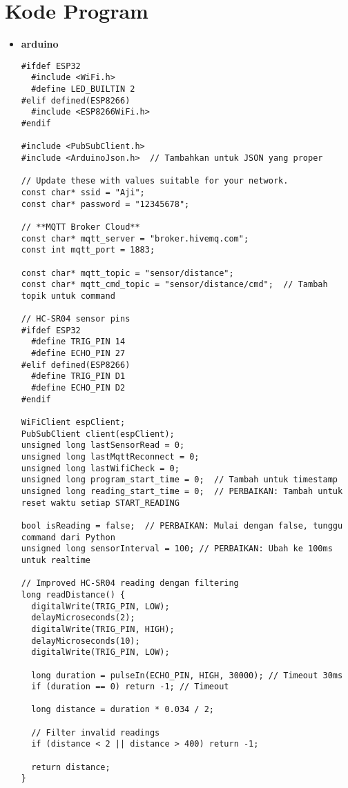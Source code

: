 \section{Kode Program}
\begin{itemize}
   \item \textbf{arduino}
   \begin{scriptsize}
    \begin{lstlisting}[language=Arduino]
       #ifdef ESP32
  #include <WiFi.h>
  #define LED_BUILTIN 2
#elif defined(ESP8266)
  #include <ESP8266WiFi.h>
#endif

#include <PubSubClient.h>
#include <ArduinoJson.h>  // Tambahkan untuk JSON yang proper

// Update these with values suitable for your network.
const char* ssid = "Aji";
const char* password = "12345678";

// **MQTT Broker Cloud**
const char* mqtt_server = "broker.hivemq.com";
const int mqtt_port = 1883;

const char* mqtt_topic = "sensor/distance";
const char* mqtt_cmd_topic = "sensor/distance/cmd";  // Tambah topik untuk command

// HC-SR04 sensor pins
#ifdef ESP32
  #define TRIG_PIN 14
  #define ECHO_PIN 27
#elif defined(ESP8266)
  #define TRIG_PIN D1
  #define ECHO_PIN D2
#endif

WiFiClient espClient;
PubSubClient client(espClient);
unsigned long lastSensorRead = 0;
unsigned long lastMqttReconnect = 0;
unsigned long lastWifiCheck = 0;
unsigned long program_start_time = 0;  // Tambah untuk timestamp
unsigned long reading_start_time = 0;  // PERBAIKAN: Tambah untuk reset waktu setiap START_READING

bool isReading = false;  // PERBAIKAN: Mulai dengan false, tunggu command dari Python
unsigned long sensorInterval = 100; // PERBAIKAN: Ubah ke 100ms untuk realtime

// Improved HC-SR04 reading dengan filtering
long readDistance() {
  digitalWrite(TRIG_PIN, LOW);
  delayMicroseconds(2);
  digitalWrite(TRIG_PIN, HIGH);
  delayMicroseconds(10);
  digitalWrite(TRIG_PIN, LOW);
  
  long duration = pulseIn(ECHO_PIN, HIGH, 30000); // Timeout 30ms
  if (duration == 0) return -1; // Timeout
  
  long distance = duration * 0.034 / 2;
  
  // Filter invalid readings
  if (distance < 2 || distance > 400) return -1;
  
  return distance;
}


\end{lstlisting}
\end{scriptsize}
\end{itemize}
